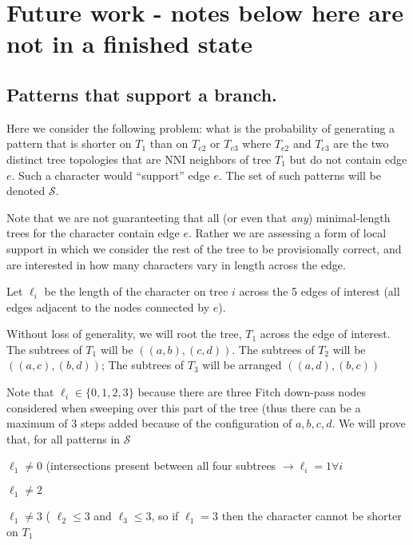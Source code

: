 \documentclass[11pt]{article}
\begin{document}
\section{{\color{red}Future work - notes below here are not in a finished state}}
\subsection{Patterns that support a branch.}
Here we consider the following problem: what is the probability of generating a pattern that is shorter on $T_1$ than on $T_{e2}$ or $T_{e3}$ where $T_{e2}$ and $T_{e3}$ are the two distinct tree topologies that are NNI neighbors of tree $T_1$ but do not contain edge $e$.
Such a character would ``support'' edge $e$.
The set of such patterns will be denoted $\mathcal{S}$.

Note that we are not guaranteeting that all (or even that {\em any}) minimal-length trees  for the character contain edge $e$. 
Rather we are assessing a form of local support in which we consider the rest of the tree to be provisionally correct, and are interested in how many characters vary in length across the edge.


Let $\ell_i$ be the length of the character on tree $i$ across the 5 edges of interest (all edges adjacent to the nodes connected by $e$).

Without loss of generality, we will root the tree, $T_1$ across the edge of interest.
The subtrees of $T_1$ will be $((a,b),(c,d))$. The subtrees of $T_2$ will be $((a,c),(b,d))$; The subtrees of $T_3$ will be arranged $((a,d),(b,c))$




Note that $\ell_i \in \{0, 1, 2, 3\}$ because there are three Fitch down-pass nodes considered when sweeping over this part of the tree (thus there can be a maximum of 3 steps added because of the configuration of $a,b,c,d$.
We will prove that, for all patterns in $\mathcal{S}$
\begin{compactenum}
	\item  $\ell_1 \neq 0$  (intersections present between all four subtrees $\rightarrow \ell_i = 1 \forall i$
	\item  $\ell_1 \neq 2$
	\item  $\ell_1 \neq 3$ ( $\ell_2 \leq 3$ and $\ell_3 \leq 3$, so if $\ell_1=3$ then the character cannot be shorter on $T_1$
\end{compactenum}


\end{document}

